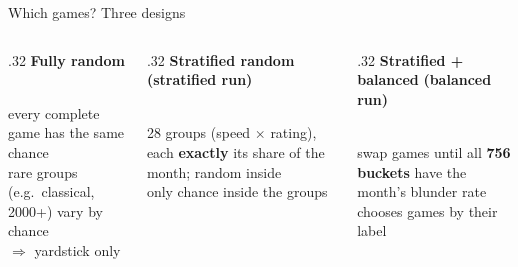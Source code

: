 \documentclass[aspectratio=169,11pt]{beamer}
\newcommand{\hl}[1]{\textcolor{accent}{\textbf{#1}}}
\begin{document}
\begin{frame}{Which games? Three designs}
  \small
  \begin{columns}[t]
    \begin{column}{.32\textwidth}
      \hl{Fully random}\\[.3em]
      \\[.3em]
      every complete game has the same chance\\[.2em]
      \textcolor{bad}{rare groups (e.g.\ classical, 2000+) vary by chance}\\[.2em]
      $\Rightarrow$ yardstick only
    \end{column}
    \begin{column}{.32\textwidth}
      \hl{Stratified random} \textbf{(stratified run)}\\[.3em]
      \\[.3em]
      28 groups (speed $\times$ rating), each \textbf{exactly} its share of the month; random inside\\[.2em]
      \textcolor{good}{only chance inside the groups}
    \end{column}
    \begin{column}{.32\textwidth}
      \hl{Stratified + balanced} \textbf{(balanced run)}\\[.3em]
      \\[.3em]
      swap games until all \textbf{756 buckets} have the month's blunder rate\\[.2em]
      \textcolor{bad}{chooses games by their label}
    \end{column}
  \end{columns}

\end{frame}
\end{document}
